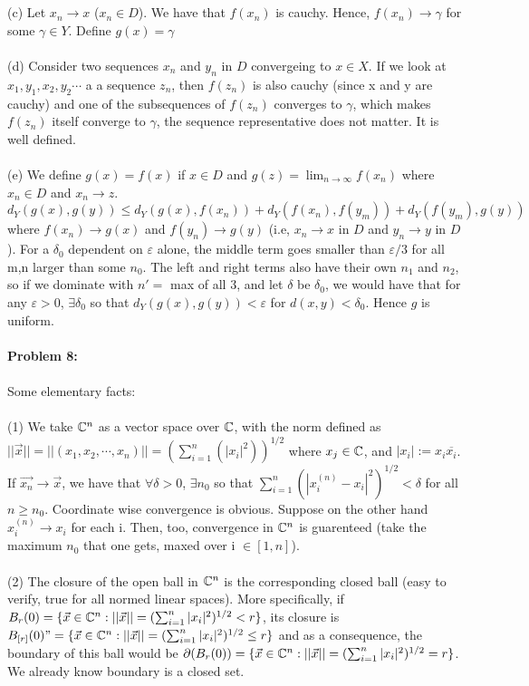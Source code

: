 \documentclass[../Main.tex]{subfiles}
\begin{document}
\\\\ (c) Let $x_n \to x$ ($x_n \in D$). We have that $f(x_n)$ is cauchy. Hence, $f(x_n) \to \gamma$ for some $\gamma \in Y$. Define $g(x)=\gamma$
\\\\ (d) Consider two sequences $x_n$ and $y_n$ in $D$ convergeing to $x \in X$. If we look at $x_1,y_1,x_2,y_2 \cdots $ a a sequence $z_n$, then $f(z_n)$ is also cauchy (since x and y are cauchy) and one of the subsequences of $f(z_n)$ converges to $\gamma$, which makes $f(z_n)$ itself converge to $\gamma$, the sequence representative does not matter. It is well defined.
\\\\ (e) We define $g(x)=f(x)$ if $x \in D$ and $g(z)=\lim_{n \to \infty} f(x_n)$ where $x_n \in D$ and $x_n \to z$. $d_Y(g(x),g(y))\leq d_Y(g(x),f(x_n))+d_Y(f(x_n),f(y_m))+d_Y(f(y_m),g(y))$ where $f(x_n) \to g(x)$ and $f(y_n) \to g(y)$ (i.e, $x_n \to x$ in $D$ and $y_n \to y$ in $D$). For a $\delta_0$ dependent on $\varepsilon$ alone, the middle term goes smaller than $\varepsilon/3$ for all m,n larger than some $n_0$. The left and right terms also have their own $n_1$ and $n_2$, so if we dominate with $n'=$ max of all 3, and let $\delta$ be $\delta_0$, we would have that for any $\varepsilon>0$, $\exists \delta_0$ so that $d_Y(g(x),g(y))<\varepsilon$ for $d(x,y)<\delta_0$. Hence $g$ is uniform.
\\\\ \textbf{Problem 8:}
\\\\ Some elementary facts:
\\\\ (1) We take $\mathbb C^n$ as a vector space over $\mathbb C$, with the norm defined as $||\vec{x}||=||(x_1,x_2,\cdots,x_n)||=(\sum_{i=1}^n(|x_i|^2))^{1/2}$ where $x_j \in \mathbb C$, and $|x_i|:=x_i \overline{x_i}$. If $\vec{x_n} \to \vec{x}$, we have that $\forall \delta>0$, $\exists n_0$ so that $\sum_{i=1}^n(|x^{(n)}_i-x_i|^2)^{1/2}<\delta$ for all $n \geq n_0$. Coordinate wise convergence is obvious. Suppose on the other hand $x_i^{(n)} \to x_i$ for each i. Then, too, convergence in $\mathbb C^n$ is guarenteed (take the maximum $n_0$ that one gets, maxed over i $\in [1,n]$). 
\\\\ (2) The closure of the open ball in $\mathbb C^n$ is the corresponding closed ball (easy to verify, true for all normed linear spaces). More specifically, if $B_{r}(0)=\{\vec{x} \in \mathbb C^n: ||\vec{x}||=(\sum_{i=1}^n |x_i|^2)^{1/2}<r\}$, its closure is $B_{[r]}(0)"=\{\vec{x} \in \mathbb C^n: ||\vec{x}||=(\sum_{i=1}^n |x_i|^2)^{1/2}\leq r\}$ and as a consequence, the boundary of this ball would be $\partial(B_{r}(0))=\{\vec{x} \in \mathbb C^n: ||\vec{x}||=(\sum_{i=1}^n |x_i|^2)^{1/2}=r\}$. We already know boundary is a closed set. 
\end{document}
